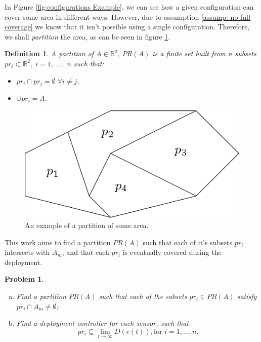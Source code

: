 \documentclass{iacas}
\newcommand{\rsqr}{\mathbb{R}^2}
\newtheorem{definition}{Definition}
\newtheorem{problem}{Problem}
\begin{document}

In Figure \ref{fig:configurations Example}, we can see how a given configuration can cover some area in different ways. However, due to assumption \ref{assump: no full coverage} we know that it isn't possible using a single configuration. Therefore, we shall \emph{partition} the area, as can be seen in figure \ref{fig:partition example}.

\begin{definition}
A \emph{partition} of $A \in \rsqr$, $PR(A)$ is a finite set built from $n$ subsets $pr_i \subset \rsqr,\; i=1,\; \ldots,\; n$ such that:
\begin{itemize}
\item $pr_i \cap pr_j = \emptyset \; \forall i \neq j$.
\item $\cup pr_i = A$.
\end{itemize}
\end{definition}

\begin{figure}[!ht]
\centering
\includegraphics[scale=0.4]{figures/problem-def/partitioning.png}
\caption{An example of a partition of some area.}
\label{fig:partition example}
\end{figure}

This work aims to find a partition $PR(A)$ such that each of it's subsets $pr_i$ intersects with $A_m$, {and} that each $pr_i$ is eventually covered during the deployment.

\begin{problem} \label{GeneralProblem}

\begin{enumerate}[(a)] 
\item Find a partition $PR(A)$ such that each of the subsets $pr_i \in PR(A)$ satisfy $pr_i \cap A_m \neq \emptyset$;
\item Find a deployment controller for each sensor, such that $$ pr_i \subseteq \lim_{t\rightarrow \infty}D(c(t)),\text{for }i=1,\ldots,n.$$
\end{enumerate}
\end{problem}
\end{document}

